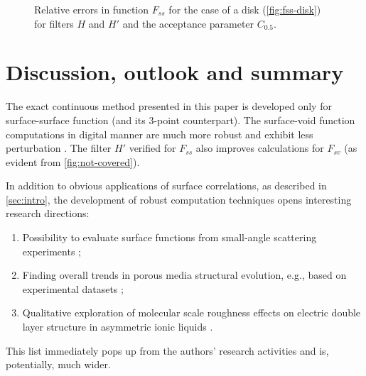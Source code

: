 \documentclass[preprint]{elsarticle}
\begin{document}
\begin{figure}[!hpt]
  \centering
  \hfill
  \caption[]{Relative errors in function $F_{ss}$ for the case of a disk
    (\cref{fig:fss-disk}) for filters $H$ and $H'$ and the acceptance parameter
    $C_{0.5}$.}
  \label{fig:error}
\end{figure}

\section{Discussion, outlook and summary}
\label{sec:summary}
The exact continuous method presented in this paper is developed only for
surface-surface function (and its 3-point counterpart). The surface-void
function computations in digital manner are much more robust and exhibit less
perturbation \cite{ma2018SS,Samarin}. The filter $H'$ verified for $F_{ss}$ also
improves calculations for $F_{sv}$ (as evident from \cref{fig:not-covered}).

In addition to obvious applications of surface correlations, as described in
\cref{sec:intro}, the development of robust computation techniques opens
interesting research directions:
\begin{enumerate}
    \item Possibility to evaluate surface functions from small-angle scattering
      experiments \cite{dietrich1995scattering};
    \item Finding overall trends in porous media structural evolution, e.g.,
      based on experimental datasets \cite{noiriel2021pore,fomin2023};
    \item Qualitative exploration of molecular scale roughness effects on electric 
      double layer structure in asymmetric ionic liquids \cite{aslyamov2021,khlyupin2023}.
\end{enumerate}
This list immediately pops up from the authors' research activities and is,
potentially, much wider.
\end{document}
